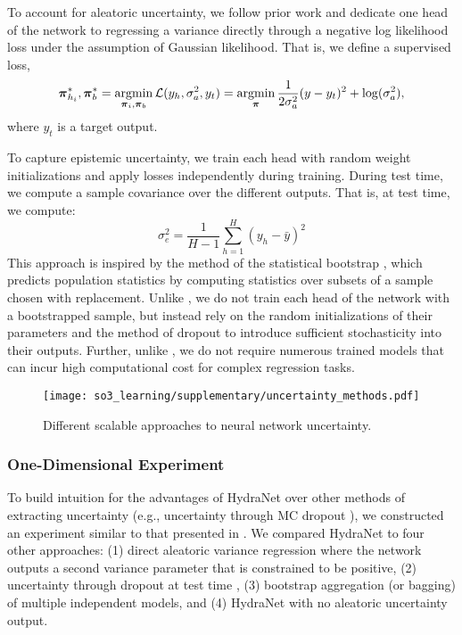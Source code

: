 To account for aleatoric uncertainty, we follow prior work \citep{Haarnoja2016-ph,Lakshminarayanan2017} and dedicate one head of the network to regressing a variance directly through a negative log likelihood loss under the assumption of Gaussian likelihood. That is, we define a supervised loss,
\begin{equation}
\boldsymbol{\mathbf{\pi}}_{h_i}^*, \boldsymbol{\mathbf{\pi}}_b^* = \operatorname*{argmin}_{\boldsymbol{\mathbf{\pi}}_i, \boldsymbol{\mathbf{\pi}}_b} \mathcal{L}(y_h, \sigma_a^2, y_t) = \operatorname*{argmin}_{\boldsymbol{\mathbf{\pi}}} \frac{1}{2\sigma_a^2}(y-y_t)^2 	+ \log(\sigma_a^2),
\end{equation}
where $y_t$ is a target output.


To capture epistemic uncertainty, we train each head with random weight initializations and apply losses independently during training. During test time, we compute a sample covariance over the different outputs. That is, at test time, we compute:
\begin{equation}
\sigma_e^2 = \frac{1}{H-1} \sum_{h=1}^H (y_h - \bar{y})^2	
\end{equation}
 This approach is inspired by the method of the statistical bootstrap \citep{Osband2016}, which predicts population statistics by computing statistics over subsets of a sample chosen with replacement. Unlike \cite{Osband2016}, we do not train each head of the network with a bootstrapped sample, but instead rely on the random initializations of their parameters and the method of dropout to introduce sufficient stochasticity into their outputs. Further, unlike \cite{Lakshminarayanan2017}, we do not require numerous trained models that can incur high computational cost for complex regression tasks.


\begin{figure*}
	\centering
	\texttt{[image: so3\_learning/supplementary/uncertainty\_methods.pdf]}
	\caption{Different scalable approaches to neural network uncertainty. }
	\label{fig:nn-uncertainty}
\end{figure*}

\subsubsection{One-Dimensional Experiment}

To build intuition for the advantages of HydraNet over other methods of extracting uncertainty (e.g., uncertainty through MC dropout \citep{Gal2016-ny}), we constructed an experiment similar to that presented in \citep{Osband2016}. We compared HydraNet to four other approaches: (1) direct aleatoric variance regression where the network outputs a second variance parameter that is constrained to be positive, (2) uncertainty through dropout at test time \citep{Gal2016-ny}, (3) bootstrap aggregation (or bagging) of multiple independent models, and (4) HydraNet with no aleatoric uncertainty output.  

